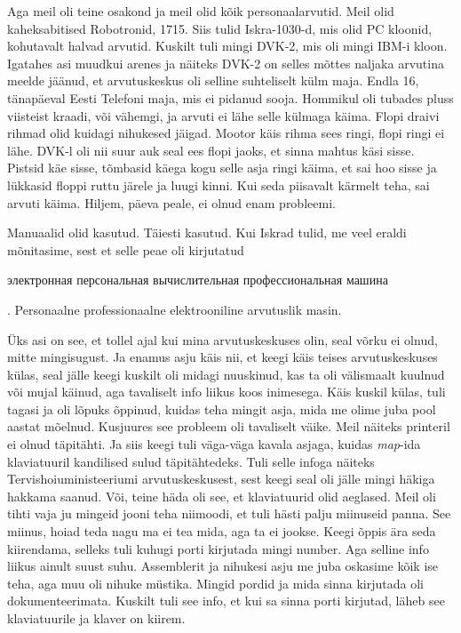 Aga meil oli teine osakond ja meil olid kõik personaalarvutid. Meil olid kaheksabitised Robotronid, 1715. Siis tulid Iskra-1030-d, mis olid PC kloonid, kohutavalt halvad arvutid. Kuskilt tuli mingi DVK-2, mis oli mingi IBM-i kloon. Igatahes asi muudkui arenes ja näiteks DVK-2 on selles mõttes naljaka arvutina meelde jäänud, et arvutuskeskus oli selline suhteliselt külm maja. Endla 16, tänapäeval Eesti Telefoni maja, mis ei pidanud sooja. Hommikul oli tubades pluss viisteist kraadi, või vähemgi, ja arvuti ei lähe selle külmaga käima. Flopi draivi rihmad olid kuidagi nihukesed jäigad. Mootor käis rihma sees ringi, flopi ringi ei lähe. DVK-l oli nii suur auk seal ees flopi jaoks, et sinna mahtus käsi sisse. Pistsid käe sisse, tõmbasid käega kogu selle asja ringi käima, et sai hoo sisse ja lükkasid floppi ruttu järele ja luugi kinni. Kui seda piisavalt kärmelt teha, sai arvuti käima. Hiljem, päeva peale, ei olnud enam probleemi. 


Manuaalid olid kasutud. Täiesti kasutud. Kui Iskrad tulid, me  veel eraldi mõnitasime, sest et selle peae oli kirjutatud \begin{russian}электронная персональная вычислительная профессиональная машина\end{russian}. Personaalne professionaalne elektrooniline arvutuslik masin. 


Üks asi on see, et tollel ajal kui mina arvutuskeskuses olin, seal võrku ei olnud, mitte mingisugust. Ja enamus asju käis nii, et keegi käis teises arvutuskeskuses külas, seal jälle keegi kuskilt oli midagi nuuskinud, kas ta oli välismaalt kuulnud või mujal käinud, aga tavaliselt info liikus koos inimesega. Käis kuskil külas,  tuli tagasi ja  oli lõpuks õppinud, kuidas teha mingit asja, mida me olime juba pool aastat mõelnud. Kusjuures see probleem oli tavaliselt väike. Meil näiteks printeril ei olnud täpitähti. Ja siis keegi tuli väga-väga kavala asjaga, kuidas \emph{map}-ida  klaviatuuril kandilised sulud täpitähtedeks. Tuli selle infoga  näiteks Tervishoiuministeeriumi arvutuskeskusest, sest keegi seal oli jälle mingi häkiga hakkama saanud. Või, teine häda oli see, et klaviatuurid olid aeglased. Meil oli tihti vaja ju mingeid jooni teha niimoodi, et tuli hästi palju miinuseid panna. See miinus, hoiad teda  nagu ma ei tea mida, aga ta ei jookse. Keegi õppis ära seda kiirendama, selleks tuli kuhugi porti kirjutada mingi number. Aga selline info liikus ainult suust suhu. Assemblerit ja nihukesi asju me juba oskasime kõik ise teha, aga muu oli nihuke müstika. Mingid pordid ja mida sinna kirjutada oli dokumenteerimata. Kuskilt tuli see info, et kui sa sinna porti kirjutad, läheb see klaviatuurile ja klaver on kiirem. 

